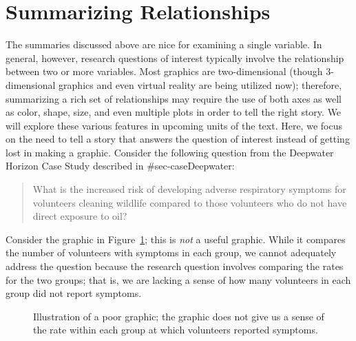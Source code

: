 \documentclass[
  letterpaper,
  DIV=11,
  numbers=noendperiod]{scrreprt}
\theoremstyle{plain}
\theoremstyle{definition}
\theoremstyle{definition}
\theoremstyle{remark}
\begin{document}
\section{Summarizing Relationships}\label{summarizing-relationships}

The summaries discussed above are nice for examining a single variable.
In general, however, research questions of interest typically involve
the relationship between two or more variables. Most graphics are
two-dimensional (though 3-dimensional graphics and even virtual reality
are being utilized now); therefore, summarizing a rich set of
relationships may require the use of both axes as well as color, shape,
size, and even multiple plots in order to tell the right story. We will
explore these various features in upcoming units of the text. Here, we
focus on the need to tell a story that answers the question of interest
instead of getting lost in making a graphic. Consider the following
question from the Deepwater Horizon Case Study described in
\#sec-caseDeepwater:

\begin{quote}
What is the increased risk of developing adverse respiratory symptoms
for volunteers cleaning wildlife compared to those volunteers who do not
have direct exposure to oil?
\end{quote}

Consider the graphic in Figure~\ref{fig-summaries-bad-barchart}; this is
\emph{not} a useful graphic. While it compares the number of volunteers
with symptoms in each group, we cannot adequately address the question
because the research question involves comparing the rates for the two
groups; that is, we are lacking a sense of how many volunteers in each
group did not report symptoms.

\begin{figure}


\caption{\label{fig-summaries-bad-barchart}Illustration of a poor
graphic; the graphic does not give us a sense of the rate within each
group at which volunteers reported symptoms.}

\end{figure}%
\end{document}
